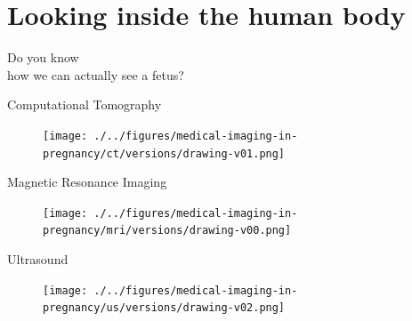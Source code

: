 \section{Looking inside the human body}


{
\begin{frame}{}

\BigSizeFont
\begin{center}
    Do you know \\
    how we can actually see a fetus?
\end{center}


\end{frame}
}


{
\begin{frame}{Computational Tomography}
      \begin{figure}
        \centering
        \texttt{[image: ./../figures/medical-imaging-in-pregnancy/ct/versions/drawing-v01.png]}
      \end{figure}
\end{frame}
}


{
\begin{frame}{Magnetic Resonance Imaging}
      \begin{figure}
        \centering
        \texttt{[image: ./../figures/medical-imaging-in-pregnancy/mri/versions/drawing-v00.png]}
      \end{figure}
\end{frame}
}


{
\begin{frame}{Ultrasound}
      \begin{figure}
        \centering
        \texttt{[image: ./../figures/medical-imaging-in-pregnancy/us/versions/drawing-v02.png]}
      \end{figure}
\end{frame}
}

